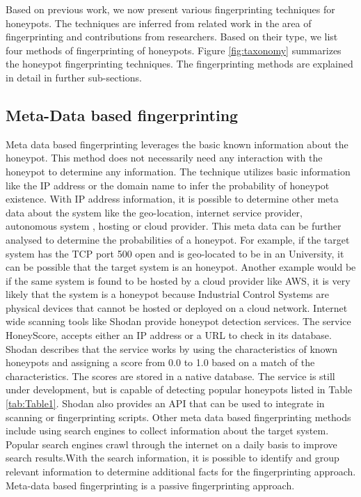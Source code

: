 \documentclass[../main.tex]{subfiles}
\begin{document}
Based on previous work, we now present various fingerprinting techniques for honeypots. The techniques are inferred from related work in the area of fingerprinting and contributions from researchers. Based on their type, we list four methods of fingerprinting of honeypots. Figure \ref{fig:taxonomy} summarizes the honeypot fingerprinting techniques.
The fingerprinting methods are explained in detail in further sub-sections. 



\subsection{Meta-Data based fingerprinting}
Meta data based fingerprinting leverages the basic known information about the honeypot. This method does not necessarily need any interaction with the honeypot to determine any information. The technique utilizes basic information like the IP address or the domain name to infer the probability of honeypot existence. With IP address information, it is possible to determine other meta data about the system like the geo-location, internet service provider, autonomous system , hosting or cloud provider. This meta data can be further analysed to determine the probabilities of a honeypot. For example, if the target system has the TCP port 500 open and is geo-located to be in an University, it can be possible that the target system is an honeypot. Another example would be if the same system is found to be hosted by a cloud provider like AWS, it is very likely that the system is a honeypot because Industrial Control Systems are physical devices that cannot be hosted or deployed on a cloud network.
Internet wide scanning tools like Shodan provide honeypot detection services. The service HoneyScore, accepts either an IP address or a URL to check in its database. Shodan describes that the service works by using the characteristics of known honeypots and assigning a score from 0.0 to 1.0 based on a match of the characteristics. The scores are stored in a native database. The service is still under development, but is capable of detecting popular honeypots listed in Table \ref{tab:Table1}. Shodan also provides an API that can be used to integrate in scanning or fingerprinting scripts. Other meta data based fingerprinting methods include using search engines to collect information about the target system. Popular search engines crawl through the internet on a daily basis to improve search results.With the search information, it is possible to identify and group relevant information to determine additional facts for the fingerprinting approach. Meta-data based fingerprinting is a passive fingerprinting approach.
\end{document}
